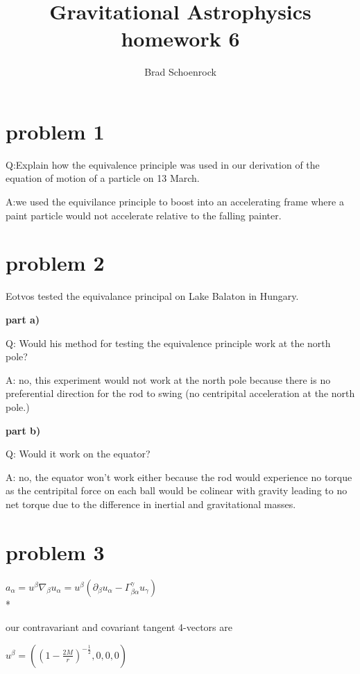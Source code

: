 \documentclass{article}
\title{Gravitational Astrophysics homework 6}
\author{Brad Schoenrock}
\date{}
\begin{document}
\maketitle
\Large


\section{problem 1}

\hspace{0.5cm}Q:Explain how the equivalence principle was used in our derivation of the equation of motion of a particle on 13 March.

A:we used the equivilance principle to boost into an accelerating frame where a paint particle would not accelerate relative to the falling painter.

\section{problem 2}
Eotvos tested the equivalance principal on Lake Balaton in Hungary.

\textbf{part a)}

Q: Would his method for testing the equivalence principle work at the north pole? 

A: no, this experiment would not work at the north pole because there is no preferential direction for the rod to swing (no centripital acceleration at the north pole.)

\textbf{part b)}

Q: Would it work on the equator?

A: no, the equator won't work either because the rod would experience no torque as the centripital force on each ball would be colinear with gravity leading to no net torque due to the difference in inertial and gravitational masses.

\section{problem 3}

\hspace{0.5cm}$a_{\alpha}=u^{\beta}\nabla_{\beta}u_{\alpha}=u^{\beta}(\partial_{\beta}u_{\alpha}-\Gamma^{\gamma}_{\beta\alpha}u_{\gamma})$
\\*

our contravariant and covariant tangent 4-vectors are 

$u^{\beta}=((1-\frac{2M}{r})^{-\frac{1}{2}},0,0,0)$
\end{document}
